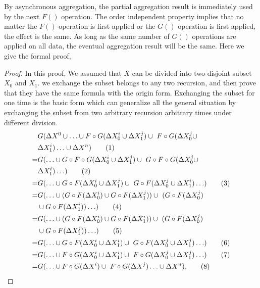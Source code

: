 By asynchronous aggregation, the partial aggregation result is immediately used by the next $F()$ operation. The order independent property implies that no matter the $F()$ operation is first applied or the $G()$ operation is first applied, the effect is the same. As long as the same number of $G()$ operations are applied on all data, the eventual aggregation result will be the same.%
Here we give the formal proof, 

\begin{proof}
	\label{sec:app:proof:correct}
	In this proof, We assumed that $X$ can be divided into two disjoint subset $X_0$ and $X_1$. we exchange the subset belongs to any two  recursion, and then prove that they have the same formula with the origin form. Exchanging the subset for one time is the basic form which can generalize all the general situation by exchanging the subset from two arbitrary recursion arbitrary times under different division.
	\begin{align}
	&G(\Delta X^0\cup \ldots \cup F\circ G(\Delta X^{i}_0 \cup \Delta X^{j}_1)\cup\ F\circ G(\Delta X^{j}_0 \cup \notag\\ &\Delta X^{i}_1) \ldots\cup \Delta X^n)\tag{1} \\
	=&G( \ldots \cup G \circ F\circ G(\Delta X^{i}_0 \cup \Delta X^{{j}}_1)\cup\ G \circ F\circ G(\Delta X^{{j}}_0 \cup \notag\\ &\Delta X^{i}_1) \ldots)\tag{2} \\
	=&G( \ldots \cup G \circ F(\Delta X^{i}_0 \cup \Delta X^{{j}}_1)\cup\ G \circ F(\Delta X^{{j}}_0 \cup \Delta X^{{i}}_1) \ldots)\tag{3} \\
	=&G( \ldots \cup (G\circ F(\Delta X^{i}_0) \cup G\circ F(\Delta X^{{j}}_1))\cup\ (G \circ F(\Delta X^{{j}}_0) \notag\\ &\cup G \circ F(\Delta X^{i}_1)) \ldots )\tag{4} \\
	=&G( \ldots \cup (G\circ F(\Delta X^{i}_0) \cup G\circ F(\Delta X^{i}_1))\cup\ (G \circ F(\Delta X^{{j}}_0) \notag\\ &\cup G  \circ F(\Delta X^{{j}}_1)) \ldots )\tag{5} \\
	=&G( \ldots \cup G \circ F(\Delta X^{i}_0 \cup \Delta X^{{i}}_1)\cup\ G \circ F(\Delta X^{{j}}_0 \cup \Delta X^{{j}}_1) \ldots)\tag{6} \\
	=&G( \ldots \cup F \circ G(\Delta X^{i}_0 \cup \Delta X^{{i}}_1)\cup\ F \circ G(\Delta X^{{j}}_0 \cup \Delta X^{{j}}_1) \ldots)\tag{7} \\
	=&G(\ldots \cup F \circ G(\Delta X^i)\cup\ F \circ G(\Delta X^{j}) \ldots\cup \Delta X^n).\tag{8}
	\end{align}
	

\end{proof}
